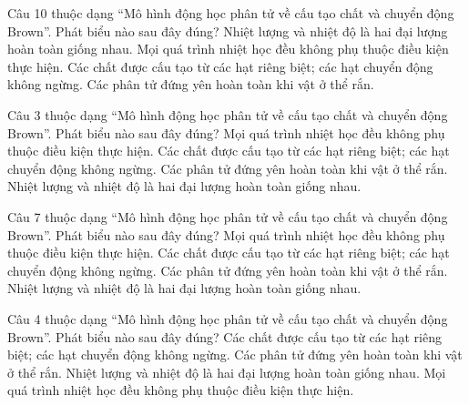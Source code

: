 \begin{ex}
Câu 10 thuộc dạng “Mô hình động học phân tử về cấu tạo chất và chuyển động Brown”. Phát biểu nào sau đây đúng?
\choice
{Nhiệt lượng và nhiệt độ là hai đại lượng hoàn toàn giống nhau.}
{Mọi quá trình nhiệt học đều không phụ thuộc điều kiện thực hiện.}
{\True Các chất được cấu tạo từ các hạt riêng biệt; các hạt chuyển động không ngừng.}
{Các phân tử đứng yên hoàn toàn khi vật ở thể rắn.}
\end{ex}

\begin{ex}
Câu 3 thuộc dạng “Mô hình động học phân tử về cấu tạo chất và chuyển động Brown”. Phát biểu nào sau đây đúng?
\choice
{Mọi quá trình nhiệt học đều không phụ thuộc điều kiện thực hiện.}
{\True Các chất được cấu tạo từ các hạt riêng biệt; các hạt chuyển động không ngừng.}
{Các phân tử đứng yên hoàn toàn khi vật ở thể rắn.}
{Nhiệt lượng và nhiệt độ là hai đại lượng hoàn toàn giống nhau.}
\end{ex}

\begin{ex}
Câu 7 thuộc dạng “Mô hình động học phân tử về cấu tạo chất và chuyển động Brown”. Phát biểu nào sau đây đúng?
\choice
{Mọi quá trình nhiệt học đều không phụ thuộc điều kiện thực hiện.}
{\True Các chất được cấu tạo từ các hạt riêng biệt; các hạt chuyển động không ngừng.}
{Các phân tử đứng yên hoàn toàn khi vật ở thể rắn.}
{Nhiệt lượng và nhiệt độ là hai đại lượng hoàn toàn giống nhau.}
\end{ex}

\begin{ex}
Câu 4 thuộc dạng “Mô hình động học phân tử về cấu tạo chất và chuyển động Brown”. Phát biểu nào sau đây đúng?
\choice
{\True Các chất được cấu tạo từ các hạt riêng biệt; các hạt chuyển động không ngừng.}
{Các phân tử đứng yên hoàn toàn khi vật ở thể rắn.}
{Nhiệt lượng và nhiệt độ là hai đại lượng hoàn toàn giống nhau.}
{Mọi quá trình nhiệt học đều không phụ thuộc điều kiện thực hiện.}
\end{ex}

